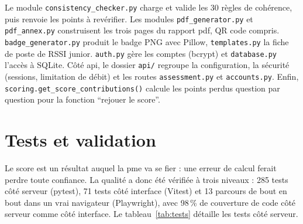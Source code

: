 Le module \texttt{consistency\_checker.py} charge et valide les 30 règles de cohérence, puis renvoie les points à revérifier. Les modules \texttt{pdf\_generator.py} et \texttt{pdf\_annex.py} construisent les trois pages du rapport \gls{pdf}, QR code compris. \texttt{badge\_generator.py} produit le badge PNG avec Pillow, \texttt{templates.py} la fiche de poste de RSSI junior. \texttt{auth.py} gère les comptes (bcrypt) et \texttt{database.py} l'accès à SQLite. Côté \gls{api}, le dossier \texttt{api/} regroupe la configuration, la sécurité (sessions, limitation de débit) et les routes \texttt{assessment.py} et \texttt{accounts.py}. Enfin, \texttt{scoring.get\_score\_contributions()} calcule les points perdus question par question pour la fonction \enquote{rejouer le score}.

\section{Tests et validation}
\label{sec:tests}

\hspace{1cm}Le score est un résultat auquel la \gls{pme} va se fier : une erreur de calcul ferait perdre toute confiance. La qualité a donc été vérifiée à trois niveaux : 285 tests côté serveur (pytest), 71 tests côté interface (Vitest) et 13 parcours de bout en bout dans un vrai navigateur (Playwright), avec 98\,\% de couverture de code côté serveur comme côté interface. Le tableau~\ref{tab:tests} détaille les tests côté serveur.

